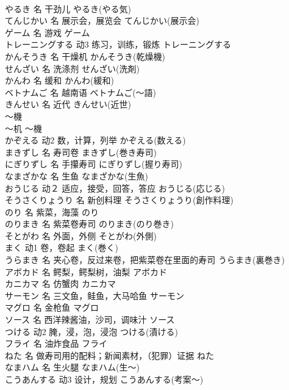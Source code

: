 \documentclass[8pt]{extreport}
\begin{document}
\begin{CJK}{UTF8}{min}
\\	やるき	名	干劲儿	やるき(やる気)	
\\	てんじかい	名	展示会，展览会	てんじかい(展示会)	
\\	ゲーム	名	游戏	ゲーム	
\\	トレーニングする	动3	练习，训练，锻炼	トレーニングする	
\\	かんそうき	名	干燥机	かんそうき(乾燥機)	
\\	せんざい	名	洗涤剂	せんざい(洗剤)	
\\	かんわ	名	缓和	かんわ(緩和)	
\\	ベトナムご	名	越南语	ベトナムご(～語)	
\\	きんせい	名	近代	きんせい(近世)	
\\	～機	
\\	～机	～機	
\\	かぞえる	动2	数，计算，列举	かぞえる(数える)	
\\	まきずし	名	寿司卷	まきずし(巻き寿司)	
\\	にぎりずし	名	手攥寿司	にぎりずし(握り寿司)	
\\	なまざかな	名	生鱼	なまざかな(生魚)	
\\	おうじる	动２	适应，接受，回答，答应	おうじる(応じる)	
\\	そうさくりょうり	名	新创料理	そうさくりょうり(創作料理)	
\\	のり	名	紫菜，海藻	のり	
\\	のりまき	名	紫菜卷寿司	のりまき(のり巻き)	
\\	そとがわ	名	外面，外侧	そとがわ(外側)	
\\	まく	动1	卷，卷起	まく(巻く)	
\\	うらまき	名	夹心卷，反过来卷，把紫菜卷在里面的寿司	うらまき(裏巻き)	
\\	アボカド	名	鳄梨，鳄梨树，油梨	アボカド	
\\	カニカマ	名	仿蟹肉	カニカマ	
\\	サーモン	名	三文鱼，鲑鱼，大马哈鱼	サーモン	
\\	マグロ	名	金枪鱼	マグロ	
\\	ソース	名	西洋辣酱油，沙司，调味汁	ソース	
\\	つける	动2	腌，浸，泡，浸泡	つける(漬ける)	
\\	フライ	名	油炸食品	フライ	
\\	ねた	名	做寿司用的配料；新闻素材，（犯罪）证据	ねた	
\\	なまハム	名	生火腿	なまハム(生～)	
\\	こうあんする	动3	设计，规划	こうあんする(考案～)	

\end{CJK}
\end{document}
